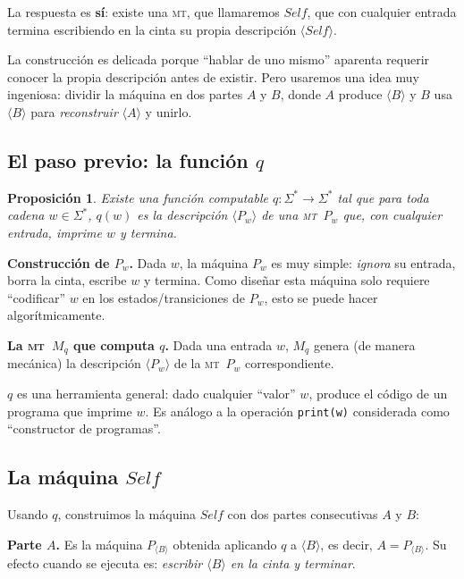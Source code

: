 \documentclass[11pt,a4paper]{article}
\theoremstyle{definicion}
\newtheorem{proposicion}[definicion]{Proposición}
\newcommand{\MT}{\textsc{mt}}
\newcommand{\enc}[1]{\langle #1 \rangle}
\begin{document}
La respuesta es \textbf{sí}: existe una \MT, que llamaremos $\mathit{Self}$, que con cualquier entrada termina escribiendo en la cinta su propia descripción $\enc{\mathit{Self}}$.

\begin{intuicion}
La construcción es delicada porque ``hablar de uno mismo'' aparenta requerir conocer la propia descripción antes de existir. Pero usaremos una idea muy ingeniosa: dividir la máquina en dos partes $A$ y $B$, donde $A$ produce $\enc{B}$ y $B$ usa $\enc{B}$ para \emph{reconstruir} $\enc{A}$ y unirlo.
\end{intuicion}

\subsection{El paso previo: la función $q$}

\begin{proposicion}\label{prop:q}
Existe una función computable $q : \Sigma^* \to \Sigma^*$ tal que para toda cadena $w \in \Sigma^*$, $q(w)$ es la descripción $\enc{P_w}$ de una \MT\ $P_w$ que, con cualquier entrada, \emph{imprime $w$ y termina}.
\end{proposicion}

\textbf{Construcción de $P_w$.} Dada $w$, la máquina $P_w$ es muy simple: \emph{ignora} su entrada, borra la cinta, escribe $w$ y termina. Como diseñar esta máquina solo requiere ``codificar'' $w$ en los estados/transiciones de $P_w$, esto se puede hacer algorítmicamente.

\textbf{La \MT\ $M_q$ que computa $q$.} Dada una entrada $w$, $M_q$ genera (de manera mecánica) la descripción $\enc{P_w}$ de la \MT\ $P_w$ correspondiente.

\begin{idea}
$q$ es una herramienta general: dado cualquier ``valor'' $w$, produce el código de un programa que imprime $w$. Es análogo a la operación \texttt{print(w)} considerada como ``constructor de programas''.
\end{idea}

\subsection{La máquina $\mathit{Self}$}

Usando $q$, construimos la máquina $\mathit{Self}$ con dos partes consecutivas $A$ y $B$:

\textbf{Parte $A$.} Es la máquina $P_{\enc{B}}$ obtenida aplicando $q$ a $\enc{B}$, es decir, $A = P_{\enc{B}}$. Su efecto cuando se ejecuta es: \emph{escribir $\enc{B}$ en la cinta y terminar}.
\end{document}
